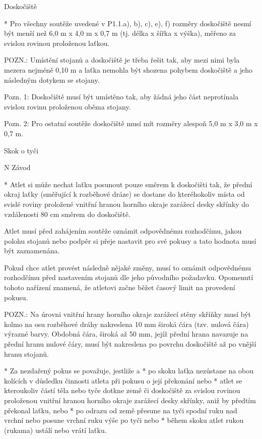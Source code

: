 Doskočiště

* Pro všechny soutěže uvedené v P1.1.a), b), c), e), f) rozměry doskočiště nesmí být menší než 6,0 m x 4,0 m x 0,7 m (tj. délka x šířka x výška), měřeno za svislou rovinou proloženou laťkou.

POZN.: Umístění stojanů a doskočiště je třeba řešit tak, aby mezi nimi byla mezera nejméně 0,10 m a laťka nemohla být shozena pohybem doskočiště a jeho následným dotykem se stojany.

Pozn. 1: Doskočiště musí být umístěno tak, aby žádná jeho část neprotínala svislou rovinu proloženou oběma stojany.

Pozn. 2: Pro ostatní soutěže doskočiště musí mít rozměry alespoň 5,0 m x 3,0 m x 0,7 m.
\enditems

\secc Skok o tyči

\begitems \style N
Závod

* Atlet si může nechat laťku posunout pouze směrem k doskočišti tak, že přední okraj laťky (směřující k rozběhové dráze) se dostane do kteréhokoliv místa od svislé roviny proložené vnitřní hranou horního okraje zarážecí desky skřínky do vzdálenosti 80 cm směrem do doskočiště.

Atlet musí před zahájením soutěže oznámit odpovědnému rozhodčímu, jakou polohu stojanů nebo podpěr si přeje nastavit pro své pokusy a tato hodnota musí být zaznamenána.

Pokud chce atlet provést následně nějaké změny, musí to oznámit odpovědnému rozhodčímu před nastavením stojanů dle jeho původního požadavku. Opomenutí tohoto nařízení znamená, že atletovi začne běžet časový limit na provedení pokusu.

POZN.: Na úrovni vnitřní hrany horního okraje zarážecí stěny skříňky musí být kolmo na osu rozběhové dráhy nakreslena 10 mm široká čára (tzv. nulová čára) výrazné barvy. Obdobná čára, široká až 50 mm, jejíž přední hrana navazuje na přední hranu nulové čáry, musí být nakreslena po povrchu doskočiště až po vnější hranu stojanů.

* Za nezdařený pokus se považuje, jestliže
  \begitems \style a
  * po skoku laťka nezůstane na obou kolících v důsledku činnosti atleta při pokusu o její překonání nebo
  * atlet se kteroukoliv částí těla nebo tyče dotkne země či doskočiště za svislou rovinou proloženou vnitřní hranou horního okraje zarážecí desky skřínky, aniž by předtím překonal laťku, nebo
  * po odrazu od země přesune na tyči spodní ruku nad vrchní nebo posune vrchní ruku výše po tyči nebo
  * během skoku atlet rukou (rukama) ustálí nebo vrátí laťku.
  \enditems

